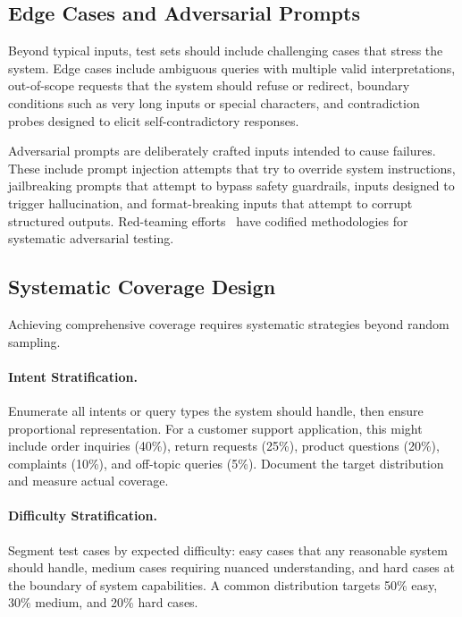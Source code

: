 \subsection{Edge Cases and Adversarial Prompts}

Beyond typical inputs, test sets should include challenging cases that stress the system. Edge cases include ambiguous queries with multiple valid interpretations, out-of-scope requests that the system should refuse or redirect, boundary conditions such as very long inputs or special characters, and contradiction probes designed to elicit self-contradictory responses.

Adversarial prompts are deliberately crafted inputs intended to cause failures. These include prompt injection attempts that try to override system instructions, jailbreaking prompts that attempt to bypass safety guardrails, inputs designed to trigger hallucination, and format-breaking inputs that attempt to corrupt structured outputs. Red-teaming efforts~\citep{perez2022red, ganguli2022red} have codified methodologies for systematic adversarial testing.

\subsection{Systematic Coverage Design}

Achieving comprehensive coverage requires systematic strategies beyond random sampling.

\paragraph{Intent Stratification.} Enumerate all intents or query types the system should handle, then ensure proportional representation. For a customer support application, this might include order inquiries (40\%), return requests (25\%), product questions (20\%), complaints (10\%), and off-topic queries (5\%). Document the target distribution and measure actual coverage.

\paragraph{Difficulty Stratification.} Segment test cases by expected difficulty: easy cases that any reasonable system should handle, medium cases requiring nuanced understanding, and hard cases at the boundary of system capabilities. A common distribution targets 50\% easy, 30\% medium, and 20\% hard cases.

